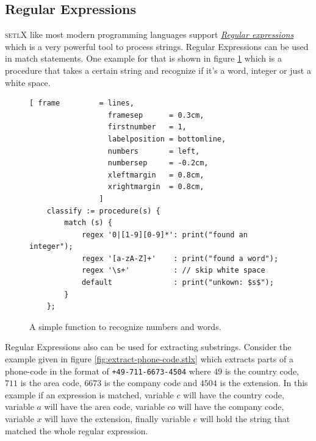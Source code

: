 \documentclass[11pt]{article}
\begin{document}
\subsection{Regular Expressions}
\textsc{setlX} like most modern programming languages support \href{http://en.wikipedia.org/wiki/Regular_expression}{\emph{Regular expressions}} which is a very powerful tool to process strings. Regular Expressions can be used in match statements. One example for that is shown in figure \ref{fig:regexp.stlx} which is a procedure that takes a certain string and recognize if it's a word, integer or just a white space.

\begin{figure}[!ht]
\centering
\begin{Verbatim}[ frame         = lines, 
                  framesep      = 0.3cm, 
                  firstnumber   = 1,
                  labelposition = bottomline,
                  numbers       = left,
                  numbersep     = -0.2cm,
                  xleftmargin   = 0.8cm,
                  xrightmargin  = 0.8cm,
                ]
    classify := procedure(s) {
        match (s) {
            regex '0|[1-9][0-9]*': print("found an integer");
            regex '[a-zA-Z]+'    : print("found a word");
            regex '\s+'          : // skip white space
            default              : print("unkown: $s$");
        }
    };
\end{Verbatim}
\vspace*{-0.3cm}
\caption{A simple function to recognize numbers and words.}
\label{fig:regexp.stlx}
\end{figure} 
Regular Expressions also can be used for extracting substrings. Consider the example given in figure \ref{fig:extract-phone-code.stlx} which extracts parts of a phone-code in the format of \texttt{+49-711-6673-4504} where $49$ is the country code, $711$ is the area code, $6673$ is the company code and $4504$ is the extension. In this example if an expression is matched, variable $c$ will have the country code, variable $a$ will have the area code, variable $co$ will have the company code, variable $x$ will have the extension, finally variable $e$ will hold the string that matched the whole regular expression.
\end{document}
